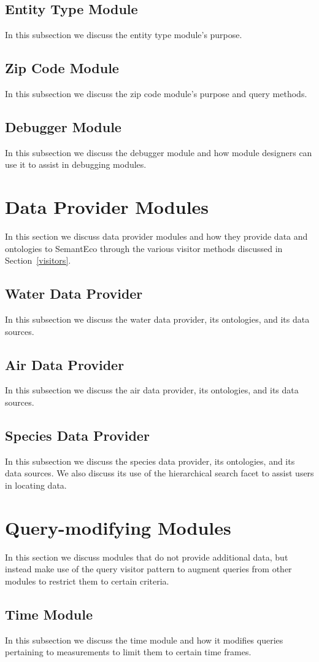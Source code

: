 \documentclass[letterpaper]{report}
\begin{document}
\subsection{Entity Type Module}
In this subsection we discuss the entity type module's purpose.
\subsection{Zip Code Module}
In this subsection we discuss the zip code module's purpose and query methods.
\subsection{Debugger Module}
In this subsection we discuss the debugger module and how module designers can use it to assist in debugging modules.
\section{Data Provider Modules}
In this section we discuss data provider modules and how they provide data and ontologies to SemantEco through the various visitor methods discussed in Section~\ref{visitors}.
\subsection{Water Data Provider}
In this subsection we discuss the water data provider, its ontologies, and its data sources.
\subsection{Air Data Provider}
In this subsection we discuss the air data provider, its ontologies, and its data sources.
\subsection{Species Data Provider}
In this subsection we discuss the species data provider, its ontologies, and its data sources. We also discuss its use of the hierarchical search facet to assist users in locating data.
\section{Query-modifying Modules}
In this section we discuss modules that do not provide additional data, but instead make use of the query visitor pattern to augment queries from other modules to restrict them to certain criteria.
\subsection{Time Module}
In this subsection we discuss the time module and how it modifies queries pertaining to measurements to limit them to certain time frames.
\end{document}
